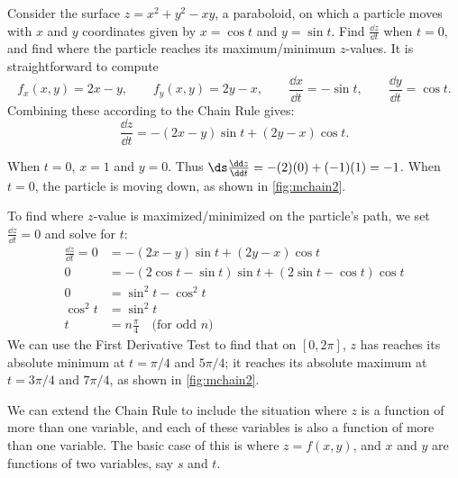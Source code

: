 \begin{example}\label{ex_mchain2}%
Consider the surface $z=x^2+y^2-xy$, a paraboloid, on which a particle moves with $x$ and $y$ coordinates given by $x=\cos t$ and $y=\sin t$. Find $\frac{\dd z}{\dd t}$ when $t=0$, and find where the particle reaches its maximum/minimum $z$-values.
\solution
It is straightforward to compute
\[f_x(x,y) = 2x-y,\qquad f_y(x,y) = 2y-x,\qquad \frac{\dd x}{\dd t} = -\sin t,\qquad \frac{\dd y}{\dd t} = \cos t.\]
Combining these according to the Chain Rule gives:
\[\frac{\dd z}{\dd t} = -(2x-y)\sin t + (2y-x)\cos t.\]

When $t=0$, $x=1$ and $y=0$. Thus $\ds\frac{\dd z}{\dd t} = -(2)(0)+ (-1)(1) = -1$. When $t=0$, the particle is moving down, as shown in \autoref{fig:mchain2}. 


To find where $z$-value is maximized/minimized on the particle's path, we set $\frac{\dd z}{\dd t}=0$ and solve for $t$:
\begin{align*}
\frac{\dd z}{\dd t} =0
	&= -(2x-y)\sin t + (2y-x)\cos t\\
	0&= -(2\cos t-\sin t)\sin t+(2\sin t-\cos t)\cos t\\
	0&= \sin^2t-\cos^2t\\
\cos^2t &=\sin^2t\\
	t&= n\frac{\pi}4\quad \text{(for odd $n$)}
\end{align*}
We can use the First Derivative Test to find that on $[0,2\pi]$, $z$ has reaches its absolute minimum at $t=\pi/4$ and $5\pi/4$; it reaches its absolute maximum at $t=3\pi/4$ and $7\pi/4$, as shown in \autoref{fig:mchain2}.
\end{example}


We can extend the Chain Rule to include the situation where $z$ is a function of more than one variable, and each of these variables is also a function of more than one variable. The basic case of this is where $z=f(x,y)$, and $x$ and $y$ are functions of two variables, say $s$ and $t$.

